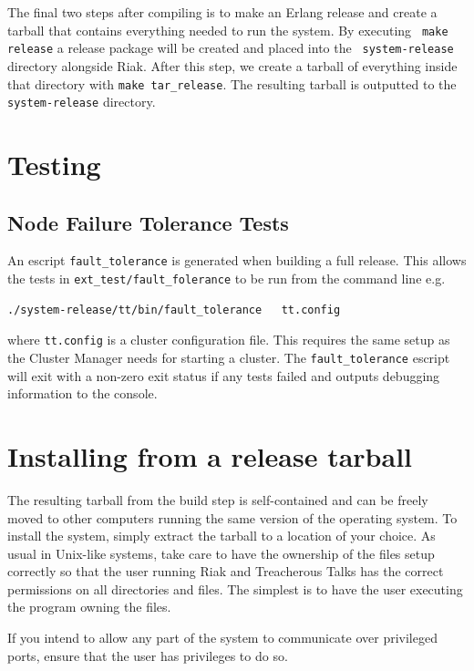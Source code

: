 \documentclass[11pt,a4paper]{report}
\begin{document}
The final two steps after compiling is to make an Erlang release and create a
tarball that contains everything needed to run the system. By executing {\tt
  make release} a release package will be created and placed into the {\tt
  system-release} directory alongside Riak. After this step, we create a tarball
of everything inside that directory with {\tt make tar\_release}. The resulting
tarball is outputted to the {\tt system-release} directory.

\section{Testing}

\subsection{Node Failure Tolerance Tests}\label{run_fault_tolerance}

An escript\cite{escript} {\tt fault\_tolerance} is generated when building a full release. This
allows the tests in {\tt ext\_test/fault\_folerance} to be run from the command
line e.g.

\begin{Verbatim}
./system-release/tt/bin/fault_tolerance   tt.config
\end{Verbatim}

where {\tt tt.config} is a cluster configuration file. This requires the same
setup as the Cluster Manager needs for starting a cluster. The
{\tt fault\_tolerance} escript will exit with a non-zero exit status if any tests
failed and outputs debugging information to the console.

\section{Installing from a release tarball}
\label{sec:installing}
The resulting tarball from the build step is self-contained and can be freely
moved to other computers running the same version of the operating system. To
install the system, simply extract the tarball to a location of your choice. As
usual in Unix-like systems, take care to have the ownership of the files setup
correctly so that the user running Riak and Treacherous Talks has the correct
permissions on all directories and files. The simplest is to have the user
executing the program owning the files.

If you intend to allow any part of the system to communicate over privileged
ports, ensure that the user has privileges to do so.
\end{document}
